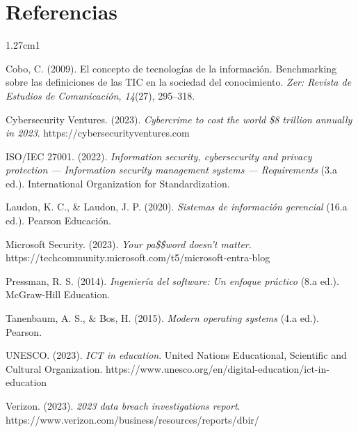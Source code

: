\documentclass[12pt,a4paper]{article}
\begin{document}
	\section{Referencias}
	
	\begin{hangparas}{1.27cm}{1}
		
		Cobo, C. (2009). El concepto de tecnologías de la información. Benchmarking sobre las definiciones de las TIC en la sociedad del conocimiento. \textit{Zer: Revista de Estudios de Comunicación, 14}(27), 295--318.
		
		Cybersecurity Ventures. (2023). \textit{Cybercrime to cost the world \$8 trillion annually in 2023}. https://cybersecurityventures.com
		
		ISO/IEC 27001. (2022). \textit{Information security, cybersecurity and privacy protection — Information security management systems — Requirements} (3.a ed.). International Organization for Standardization.
		
		Laudon, K. C., \& Laudon, J. P. (2020). \textit{Sistemas de información gerencial} (16.a ed.). Pearson Educación.
		
		Microsoft Security. (2023). \textit{Your pa\$\$word doesn't matter}. https://techcommunity.microsoft.com/t5/microsoft-entra-blog
		
		Pressman, R. S. (2014). \textit{Ingeniería del software: Un enfoque práctico} (8.a ed.). McGraw-Hill Education.
		
		Tanenbaum, A. S., \& Bos, H. (2015). \textit{Modern operating systems} (4.a ed.). Pearson.
		
		UNESCO. (2023). \textit{ICT in education}. United Nations Educational, Scientific and Cultural Organization. https://www.unesco.org/en/digital-education/ict-in-education
		
		Verizon. (2023). \textit{2023 data breach investigations report}. https://www.verizon.com/business/resources/reports/dbir/
		
	\end{hangparas}
	
\end{document}
